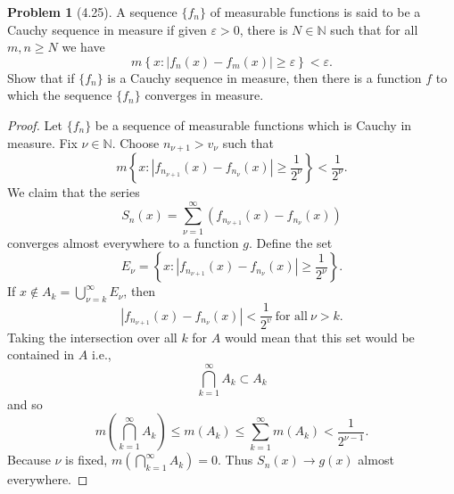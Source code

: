 \documentclass[12pt]{article}
\newcommand{\N}{\mathbb{N}}
\renewcommand{\epsilon}{\varepsilon}
\theoremstyle{definition}
\newtheorem{problem}{Problem}
\begin{document}
\begin{problem}[4.25]

    A sequence \( \{f_n\} \) of measurable functions is said to be a Cauchy sequence in measure if given \( \epsilon > 0 \), there is \( N \in \N \) such that for all \( m, n \geq N \) we have 
        \[
            m \left\{ x: \left| f_n(x) - f_m(x) \right| \geq \epsilon \right\} < \epsilon.
        \]
    Show that if \( \{f_n\} \) is a Cauchy sequence in measure, 
    then there is a function \( f \) to which the sequence \( \{f_n\} \) converges in measure. 
    
    \begin{proof}
        Let \( \{f_n\} \) be a sequence of measurable functions which is Cauchy in measure. Fix \( \nu \in \N \). Choose \( n_{\nu + 1} > v_{\nu} \) such that 
            \[  
                m \left\{ x: \left|f_{n_{\nu+1}}(x) - f_{n_{\nu}}(x) \right| \geq \frac{1}{2^{\nu}} \right\} < \frac{1}{2^{\nu}}.
            \]
        We claim that the series
            \[
               S_n(x) =  \sum_{\nu=1}^{\infty} \left( f_{n_{\nu +1}}(x) - f_{n_{\nu}}(x) \right)  
            \]
        converges almost everywhere to a function \( g \). Define the set
            \[  
                E_{\nu} = \left\{ x: \left|f_{n_{\nu+1}}(x) - f_{n_{\nu}}(x) \right| \geq \frac{1}{2^{\nu}} \right\}.
            \]
        If \( \displaystyle x \not\in A_k = \bigcup_{\nu = k}^{\infty} E_{\nu} \), then
            \[  
                \left| f_{n_{\nu +1}}(x) - f_{n_{\nu}}(x) \right| < \frac{1}{2^{v}} \ \text{for all} \ \nu > k.
            \]
        Taking the intersection over all \( k \) for \( A \) would mean that this set would be contained in \( A \) i.e.,
            \[  
                    \bigcap_{k=1}^{\infty} A_k \subset A_k
            \]
        and so 
            \[  
                m \left(\bigcap_{k=1}^{\infty} A_k \right) \leq m\left( A_k \right) \leq \sum_{k=1}^{\infty} m(A_k) < \frac{1}{2^{\nu - 1}}.
            \]
        Because \( \nu \) is fixed, \( \displaystyle  m \left(\bigcap_{k=1}^{\infty} A_k \right) = 0 \). 
        Thus \( S_n(x) \to g(x) \) almost everywhere.


\end{proof}
\end{problem}
\end{document}
